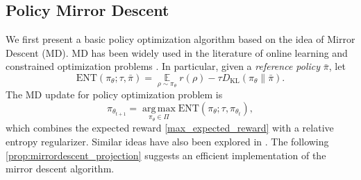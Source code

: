 \documentclass{article}
\DeclareMathOperator*\argmax{arg\,max}
\DeclareMathOperator*\ep{\mathbb{E}}
\newcommand*{\refPi}{\bar{\pi}}
\newcommand{\KL}{D_{\text{KL}}}
\newcommand{\ENT}{\text{ENT}}
\newcommand{\pithetat}{\pi_{\theta_t}}
\begin{document}
\subsection{Policy Mirror Descent}
\label{sec:pmd}
We first present a basic policy optimization algorithm based on the idea of Mirror Descent (MD). MD has been widely used in the literature of online learning and constrained optimization problems \cite{nemirovskii1983problem,beck2003mirror}. In particular, given a \emph{reference policy} $\refPi$, let 
\[
\ENT(\pi_\theta; \tau, \refPi) = { \ep\limits_{\rho \sim \pi_\theta}{  r(\rho)  - \tau \KL(\pi_\theta \| \refPi) } }.
\]
The MD update for policy optimization problem is 
\begin{equation}
\label{eq:max_expected_reward_plus_relative_entropy}
\pi_{\theta_{t+1}} = \argmax\limits_{\pi_\theta \in \Pi}  \ENT(\pi_\theta; \tau, \pithetat), 
\end{equation}
which combines the expected reward \cref{max_expected_reward} with a relative entropy regularizer.
Similar ideas have also been explored in \cite{peters2007reinforcement,wierstra2008episodic,peters2010relative,schulman2015trust,montgomery2016guided,nachum2017trust,haarnoja2018soft,abdolmaleki2018maximum}. The following \cref{prop:mirrordescent_projection} suggests an efficient implementation of the mirror descent algorithm.
\end{document}
